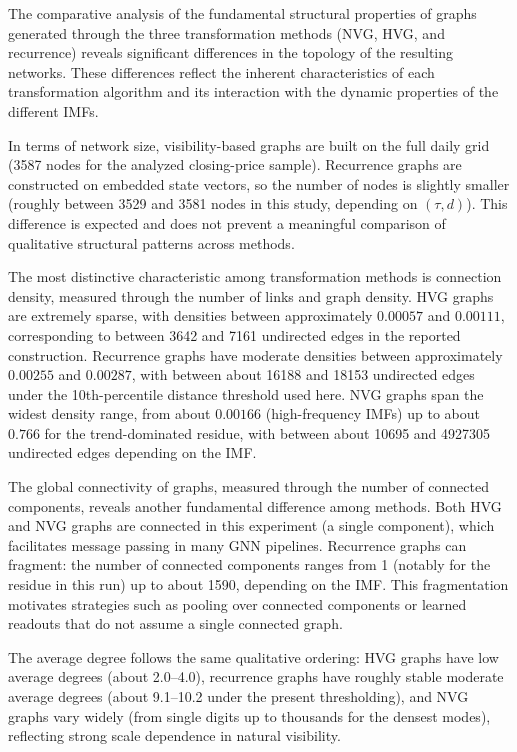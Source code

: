 \documentclass[11pt,a4paper]{article}
\begin{document}
The comparative analysis of the fundamental structural properties of graphs generated through the three transformation methods (NVG, HVG, and recurrence) reveals significant differences in the topology of the resulting networks. These differences reflect the inherent characteristics of each transformation algorithm and its interaction with the dynamic properties of the different IMFs.

In terms of network size, visibility-based graphs are built on the full daily grid (3587 nodes for the analyzed closing-price sample). Recurrence graphs are constructed on embedded state vectors, so the number of nodes is slightly smaller (roughly between 3529 and 3581 nodes in this study, depending on $(\tau,d)$). This difference is expected and does not prevent a meaningful comparison of qualitative structural patterns across methods.

The most distinctive characteristic among transformation methods is connection density, measured through the number of links and graph density. HVG graphs are extremely sparse, with densities between approximately $0.00057$ and $0.00111$, corresponding to between 3642 and 7161 undirected edges in the reported construction. Recurrence graphs have moderate densities between approximately $0.00255$ and $0.00287$, with between about 16188 and 18153 undirected edges under the 10th-percentile distance threshold used here. NVG graphs span the widest density range, from about $0.00166$ (high-frequency IMFs) up to about $0.766$ for the trend-dominated residue, with between about 10695 and 4927305 undirected edges depending on the IMF.

The global connectivity of graphs, measured through the number of connected components, reveals another fundamental difference among methods. Both HVG and NVG graphs are connected in this experiment (a single component), which facilitates message passing in many GNN pipelines. Recurrence graphs can fragment: the number of connected components ranges from 1 (notably for the residue in this run) up to about 1590, depending on the IMF. This fragmentation motivates strategies such as pooling over connected components or learned readouts that do not assume a single connected graph.

The average degree follows the same qualitative ordering: HVG graphs have low average degrees (about 2.0--4.0), recurrence graphs have roughly stable moderate average degrees (about 9.1--10.2 under the present thresholding), and NVG graphs vary widely (from single digits up to thousands for the densest modes), reflecting strong scale dependence in natural visibility.
\end{document}
